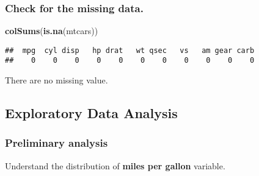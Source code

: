 \documentclass[
]{article}
\newenvironment{Shaded}{\begin{snugshade}}{\end{snugshade}}
\newcommand{\AttributeTok}[1]{\textcolor[rgb]{0.13,0.29,0.53}{#1}}
\newcommand{\FunctionTok}[1]{\textcolor[rgb]{0.13,0.29,0.53}{\textbf{#1}}}
\newcommand{\NormalTok}[1]{#1}
\newcommand{\OtherTok}[1]{\textcolor[rgb]{0.56,0.35,0.01}{#1}}
\newcommand{\SpecialCharTok}[1]{\textcolor[rgb]{0.81,0.36,0.00}{\textbf{#1}}}
\newcommand{\StringTok}[1]{\textcolor[rgb]{0.31,0.60,0.02}{#1}}
\begin{document}
\hypertarget{check-for-the-missing-data.}{%
\subsubsection{Check for the missing
data.}\label{check-for-the-missing-data.}}

\begin{Shaded}
\begin{Highlighting}[]
\FunctionTok{colSums}\NormalTok{(}\FunctionTok{is.na}\NormalTok{(mtcars))}
\end{Highlighting}
\end{Shaded}

\begin{verbatim}
##  mpg  cyl disp   hp drat   wt qsec   vs   am gear carb 
##    0    0    0    0    0    0    0    0    0    0    0
\end{verbatim}

There are no missing value.

\hypertarget{exploratory-data-analysis}{%
\subsection{Exploratory Data Analysis}\label{exploratory-data-analysis}}

\hypertarget{preliminary-analysis}{%
\subsubsection{Preliminary analysis}\label{preliminary-analysis}}

Understand the distribution of \textbf{miles per gallon} variable.

\begin{Shaded}
\end{Shaded}
\end{document}
